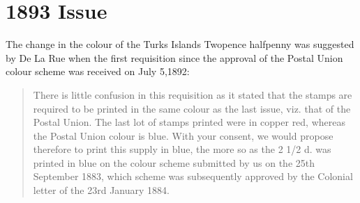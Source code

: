 \chapter{1893 Issue} 

The change in the colour of the Turks Islands Twopence halfpenny
was suggested by De La Rue when the first requisition since the
approval of the Postal Union colour scheme was received on July 5,1892:

\begin{quotation}
There is little confusion in this requisition as it stated that
the stamps are required to be printed in the same colour as the last
issue, viz. that of the Postal Union. The last lot of stamps printed
were in copper red, whereas the Postal Union colour is blue. With
your consent, we would propose therefore to print this supply in blue,
the more so as the 2 1/2 d. was printed in blue on the colour scheme 
submitted by us on the 25th September 1883, which scheme was
subsequently approved by the Colonial letter of the 23rd January 1884.

\end{quotation}

